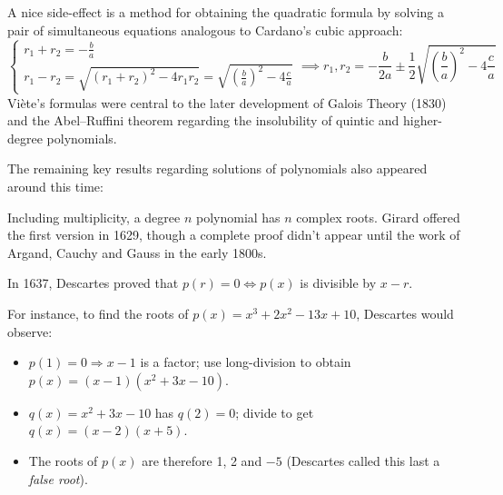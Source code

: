 A nice side-effect is a method for obtaining the quadratic formula by solving a pair of simultaneous equations analogous to Cardano's cubic approach:
\[
	\begin{cases}
		r_1+r_2=-\frac ba\\
		r_1-r_2=\sqrt{(r_1+r_2)^2-4r_1r_2}=\sqrt{\left(\frac ba\right)^2-4\frac ca}
	\end{cases}
	\implies r_1,r_2=-\frac b{2a}\pm\frac 12\sqrt{\left(\frac ba\right)^2-4\frac ca}
\]
Viète's formulas were central to the later development of Galois Theory (1830) and the Abel--Ruffini theorem regarding the insolubility of quintic and higher-degree polynomials.\medbreak

The remaining key results regarding solutions of polynomials also appeared around this time:
\begin{description}\label{pg:factorthm}
	\item[Fundamental Theorem of Algebra] Including multiplicity, a degree $n$ polynomial has $n$ complex roots. Girard offered the first version in 1629, though a complete proof didn't appear until the work of Argand, Cauchy and Gauss in the early 1800s.
	\item[Factor Theorem] In 1637, Descartes proved that $p(r)=0\Longleftrightarrow p(x)$ is divisible by $x-r$.\par
For instance, to find the roots of $p(x)=x^3+2x^2-13x+10$, Descartes would observe:
	\begin{itemize}
	  \item $p(1)=0\Longrightarrow x-1$ is a factor; use long-division to obtain $p(x)=(x-1)(x^2+3x-10)$.
	  \item $q(x)=x^2+3x-10$ has $q(2)=0$; divide to get $q(x)=(x-2)(x+5)$.
	  \item The roots of $p(x)$ are therefore 1, 2 and $-5$ (Descartes called this last a \emph{false root}).
	\end{itemize}
\end{description}

\goodbreak



